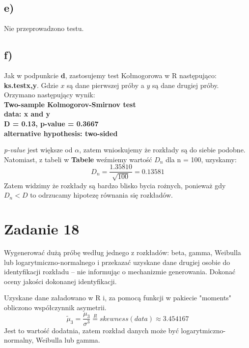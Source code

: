 \documentclass{article}
\begin{document}
\subsection{e)}
Nie przeprowadzono testu.

\subsection{f)}
Jak w podpunkcie \textbf{d}, zastosujemy test Kołmogorowa w R następująco: \textbf{ks.test{x,y}}. Gdzie $x$ są dane pierwszej próby a $y$ są dane drugiej próby. Orzymano następujący wynik: \\
\textbf{
Two-sample Kolmogorov-Smirnov test \\
data:  x and y \\
D = 0.13, p-value = 0.3667 \\
alternative hypothesis: two-sided \\
}

\textit{p-value} jest większe od $\alpha$, zatem wnioskujemy że rozkłady są do siebie podobne. Natomiast, z tabeli w \textbf{Tabele} weźmiemy wartość $D_n$ dla n = 100, uzyskamy:
\[ D_n = \frac{1.35810}{\sqrt{100}} = 0.13581 \]
Zatem widzimy że rozkłady są bardzo blisko bycia rożnych, ponieważ  gdy $D_n < D$ to odrzucamy hipotezę równania się rozkładów.

\newpage
\section{Zadanie 18}
Wygenerować dużą próbę według jednego z rozkładów: beta, gamma, Weibulla lub logarytmiczno-normalnego i przekazać uzyskane dane drugiej osobie do identyfikacji rozkładu – nie informując o mechanizmie generowania. Dokonać oceny jakości dokonanej identyfikacji. \\ \par

Uzyskane dane załadowano w R i, za pomocą funkcji w pakiecie "moments" obliczono współczynnik asymetrii.
\[ \tilde{\mu}_3 = \frac{\mu_3}{\sigma^3} \overset{R}{=} skewness(data) \approx 3.454167 \]
Jest to wartość dodatnia, zatem rozkład danych może być logarytmiczno-normalny, Weibulla lub gamma.
\end{document}
